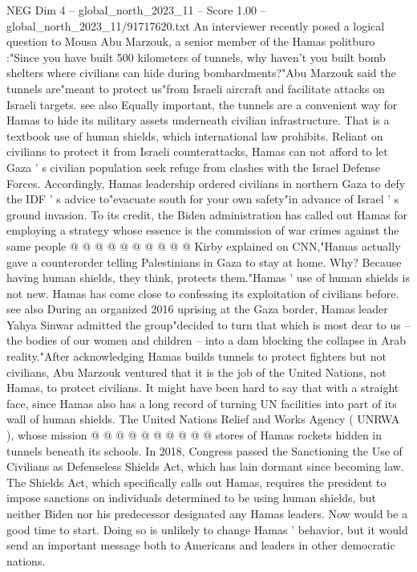 \begin{textsample}{NEG Dim 4 – global\_north\_2023\_11 – Score 1.00 – global\_north\_2023\_11/91717620.txt}  \label{ex:f4_neg_182}
An interviewer recently posed a logical question to Mousa Abu Marzouk, a senior member of the Hamas politburo :"Since you have built 500 kilometers of tunnels, why haven't you built bomb shelters where civilians can hide during bombardments?"Abu Marzouk said the tunnels are"meant to protect us"from Israeli aircraft and facilitate attacks on Israeli targets. see also Equally important, the tunnels are a convenient way for Hamas to hide its military assets underneath civilian infrastructure.
That is a textbook use of human shields, which international law prohibits.
Reliant on civilians to protect it from Israeli counterattacks, Hamas can not afford to let Gaza ' s civilian population seek refuge from clashes with the Israel Defense Forces.
Accordingly, Hamas leadership ordered civilians in northern Gaza to defy the IDF ' s advice to"evacuate south for your own safety"in advance of Israel ' s ground invasion.
To its credit, the Biden administration has called out Hamas for employing a strategy whose essence is the commission of war crimes against the same people @ @ @ @ @ @ @ @ @ @ Kirby explained on CNN,"Hamas actually gave a counterorder telling Palestinians in Gaza to stay at home.
Why?
Because having human shields, they think, protects them."Hamas ' use of human shields is not new.
Hamas has come close to confessing its exploitation of civilians before. see also During an organized 2016 uprising at the Gaza border, Hamas leader Yahya Sinwar admitted the group"decided to turn that which is most dear to us -- the bodies of our women and children -- into a dam blocking the collapse in Arab reality."After acknowledging Hamas builds tunnels to protect fighters but not civilians, Abu Marzouk ventured that it is the job of the United Nations, not Hamas, to protect civilians.
It might have been hard to say that with a straight face, since Hamas also has a long record of turning UN facilities into part of its wall of human shields.
The United Nations Relief and Works Agency ( UNRWA ), whose mission @ @ @ @ @ @ @ @ @ @ stores of Hamas rockets hidden in tunnels beneath its schools.
In 2018, Congress passed the Sanctioning the Use of Civilians as Defenseless Shields Act, which has lain dormant since becoming law.
The Shields Act, which specifically calls out Hamas, requires the president to impose sanctions on individuals determined to be using human shields, but neither Biden nor his predecessor designated any Hamas leaders.
Now would be a good time to start.
Doing so is unlikely to change Hamas ' behavior, but it would send an important message both to Americans and leaders in other democratic nations.

\end{textsample}
